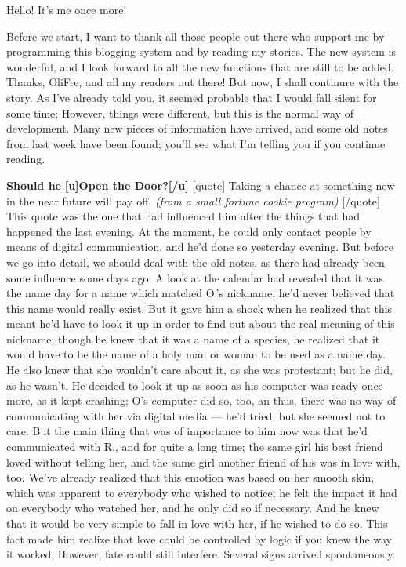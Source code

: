 Hello! It's me once more!

Before we start, I want to thank all those people out there who support me by programming this blogging system and by reading my stories. The new system is wonderful, and I look forward to all the new functions that are still to be added. Thanks, OliFre, and all my readers out there!
But now, I shall continure with the story. As I've already told you, it seemed probable that I would fall silent for some time; However, things were different, but this is the normal way of development. Many new pieces of information have arrived, and some old notes from last week have been found; you'll see what I'm telling you if you continue reading. 

\textbf{Should he}
\textbf{[u]Open the Door?[/u]}
[quote]
Taking a chance at something new in the near future will pay off. 
\emph{(from a small fortune cookie program)}
[/quote]
This quote was the one that had influenced him after the things that had happened the last evening. At the moment, he could only contact people by means of digital communication, and he'd done so yesterday evening. 
But before we go into detail, we should deal with the old notes, as there had already been some influence some days ago. 
A look at the calendar had revealed that it was the name day for a name which matched O.'s nickname; he'd never believed that this name would really exist. But it gave him a shock when he realized that this meant he'd have to look it up in order to find out about the real meaning of this nickname; though he knew that it was a name of a species, he realized that it would have to be the name of a holy man or woman to be used as a name day. 
He also knew that she wouldn't care about it, as she was protestant; but he did, as he wasn't. 
He decided to look it up as soon as his computer was ready once more, as it kept crashing; O's computer did so, too, an thus, there was no way of communicating with her via digital media --- he'd tried, but she seemed not to care. 
But the main thing that was of importance to him now was that he'd communicated with R., and for quite a long time; the same girl his best friend loved without telling her, and the same girl another friend of his was in love with, too. We've already realized that this emotion was based on her smooth skin, which was apparent to everybody who wished to notice; he felt the impact it had on everybody who watched her, and he only did so if necessary. And he knew that it would be very simple to fall in love with her, if he wished to do so. 
This fact made him realize that love could be controlled by logic if you knew the way it worked; However, fate could still interfere. Several signs arrived spontaneously. 
